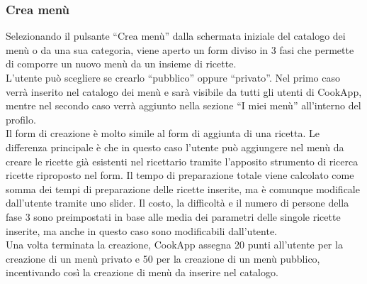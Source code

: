 \begin{itemize}
\subsubsection{Crea menù}
Selezionando il pulsante ``Crea menù'' dalla schermata iniziale del
catalogo dei menù o da una sua categoria, viene aperto un form diviso in
3 fasi che permette di comporre un nuovo menù da un insieme di
ricette.\\
L'utente può scegliere se crearlo ``pubblico'' oppure ``privato''. Nel primo
caso verrà inserito nel catalogo dei menù e sarà visibile da tutti gli
utenti di CookApp, mentre nel secondo caso verrà aggiunto nella sezione
``I miei menù'' all'interno del profilo.\\ 
Il form di creazione è molto simile al form di aggiunta di una ricetta.
Le differenza principale è che in questo caso l'utente può aggiungere
nel menù da creare le ricette già esistenti nel ricettario tramite
l'apposito strumento di ricerca ricette riproposto nel form. Il tempo di
preparazione totale viene calcolato come somma dei tempi di preparazione
delle ricette inserite, ma è comunque modificale dall'utente tramite uno
slider. Il costo, la difficoltà e il numero di persone della fase 3 sono preimpostati
in base alle media dei parametri delle singole ricette inserite, ma
anche in questo caso sono modificabili dall'utente.\\
Una volta terminata la creazione, CookApp assegna 20 punti all'utente
per la creazione di un 
menù privato e 50 per la creazione di un menù pubblico, incentivando
così la creazione di menù da inserire nel catalogo. 


\end{itemize}
